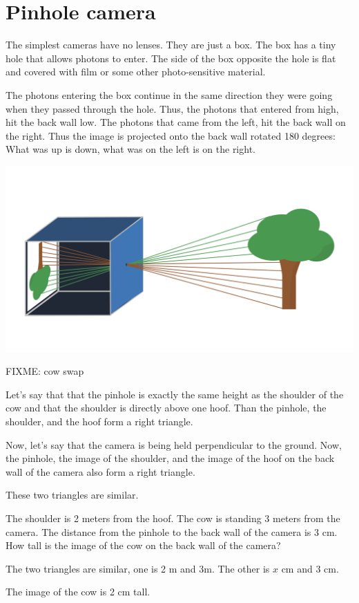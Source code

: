 \section{Pinhole camera}

The simplest cameras have no lenses. They are just a box.  The box has
a tiny hole that allows photons to enter.  The side of the box
opposite the hole is flat and covered with film or some other
photo-sensitive material.

The photons entering the box continue in the same direction they were
going when they passed through the hole.  Thus, the photons that
entered from high, hit the back wall low.  The photons that came from
the left, hit the back wall on the right. Thus the image is projected
onto the back wall rotated 180 degrees: What was up is down, what was
on the left is on the right.

\includegraphics[width=1\textwidth]{pinholeCamera.png}


\begin{Exercise}[title={Height of the image}, label=image_height]

FIXME: cow swap

Let's say that that the pinhole is exactly the same height as the
shoulder of the cow and that the shoulder is directly above one hoof.
Than the pinhole, the shoulder, and the hoof form a right triangle.

Now, let's say that the camera is being held perpendicular to the
ground.  Now, the pinhole, the image of the shoulder, and the image of
the hoof on the back wall of the camera also form a right triangle.

These two triangles are similar.

The shoulder is 2 meters from the hoof.  The cow is standing 3 meters
from the camera.  The distance from the pinhole to the back wall of
the camera is 3 cm.  How tall is the image of the cow on the back wall
of the camera?

\end{Exercise}
\begin{Answer}[ref=image_height]

The two triangles are similar, one is 2 m and 3m.  The other is $x$ cm and 3 cm.

The image of the cow is 2 cm tall.

\end{Answer}

